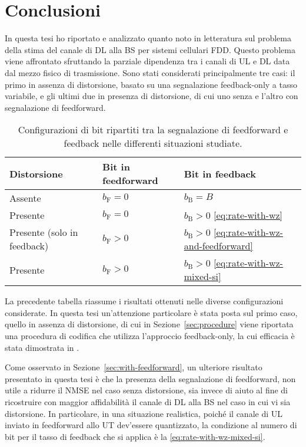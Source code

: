 \chapter{Conclusioni}

\thispagestyle{empty}

In questa tesi ho riportato e analizzato quanto noto in letteratura sul
problema della stima del canale di DL alla BS per sistemi cellulari FDD. Questo
problema viene affrontato sfruttando la parziale dipendenza tra i canali di UL
e DL data dal mezzo fisico di trasmissione. Sono stati considerati
principalmente tre casi: il primo in assenza di distorsione, basato su una
segnalazione feedback-only a tasso variabile, e gli ultimi due in presenza di
distorsione, di cui uno senza e l'altro con segnalazione di feedforward.

\begin{table}[ht]
    \centering
    \renewcommand{\arraystretch}{1.4}
    \begin{tabular}{lll}
        \toprule
        Distorsione & Bit in feedforward & Bit in feedback \\
        \midrule
        Assente                     & \(b_\mathrm{F} = 0\) & \(b_\mathrm{B} = B\) \\
        Presente                    & \(b_\mathrm{F} = 0\) & \(b_\mathrm{B} > 0\) \eqref{eq:rate-with-wz} \\
        Presente (solo in feedback) & \(b_\mathrm{F} > 0\) & \(b_\mathrm{B} > 0\) \eqref{eq:rate-with-wz-and-feedforward} \\
        Presente                    & \(b_\mathrm{F} > 0\) & \(b_\mathrm{B} > 0\) \eqref{eq:rate-with-wz-mixed-si} \\
        \bottomrule
    \end{tabular}
    \caption{
        Configurazioni di bit ripartiti tra la segnalazione di feedforward e
        feedback nelle differenti situazioni studiate.
    }
    \label{tab:results-summary}
\end{table}

La precedente tabella riassume i risultati ottenuti nelle diverse
configurazioni considerate. In questa tesi un'attenzione particolare è stata
posta sul primo caso, quello in assenza di distorsione, di cui in
Sezione~\ref{sec:procedure} viene riportata una procedura di codifica che
utilizza l'approccio feedback-only, la cui efficacia è stata dimostrata in
\cite{https://doi.org/10.1002/ett.3628}.

Come osservato in Sezione~\ref{sec:with-feedforward}, un ulteriore risultato
presentato in questa tesi è che la presenza della segnalazione di feedforward,
non utile a ridurre il NMSE nel caso senza distorsione, sia invece di aiuto al
fine di ricostruire con maggior affidabilità il canale di DL alla BS nel caso
in cui vi sia distorsione. In particolare, in una situazione realistica, poiché
il canale di UL inviato in feedforward allo UT dev'essere quantizzato, la
condizione al numero di bit per il tasso di feedback che si applica è la
\eqref{eq:rate-with-wz-mixed-si}.
